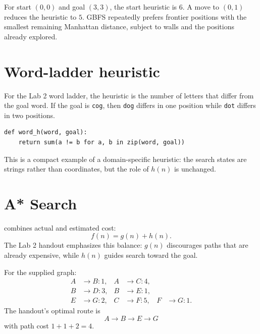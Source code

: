 \begin{workedexample}
For start \((0,0)\) and goal \((3,3)\), the start heuristic is \(6\). A move to \((0,1)\) reduces the heuristic to \(5\). GBFS repeatedly prefers frontier positions with the smallest remaining Manhattan distance, subject to walls and the positions already explored.
\end{workedexample}

\section{Word-ladder heuristic}

For the Lab 2 word ladder, the heuristic is the number of letters that differ from the goal word. If the goal is \texttt{cog}, then \texttt{dog} differs in one position while \texttt{dot} differs in two positions.

\begin{lstlisting}[style=mlpython]
def word_h(word, goal):
    return sum(a != b for a, b in zip(word, goal))
\end{lstlisting}

This is a compact example of a domain-specific heuristic: the search states are strings rather than coordinates, but the role of \(h(n)\) is unchanged.

\section{A* Search}

 combines actual and estimated cost:
\[
f(n)=g(n)+h(n).
\]
The Lab 2 handout emphasizes this balance: \(g(n)\) discourages paths that are already expensive, while \(h(n)\) guides search toward the goal.

For the supplied graph:
\begin{align*}
A&\to B:1, & A&\to C:4,\\
B&\to D:3, & B&\to E:1,\\
E&\to G:2, & C&\to F:5, & F&\to G:1.
\end{align*}
The handout's optimal route is
\[
A\to B\to E\to G
\]
with path cost \(1+1+2=4\).

\begin{mlfigure}
\end{mlfigure}

